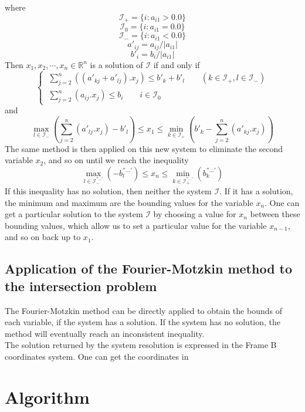 \documentclass[12pt, a4paper]{article}
\begin{document}
where 
$$\mathcal{I}_+=\{i:a_{i1}>0.0\}$$
$$\mathcal{I}_0=\{i:a_{i1}=0.0\}$$
$$\mathcal{I}_-=\{i:a_{i1}<0.0\}$$
$$a'_{ij}=a_{ij}/|a_{i1}|$$
$$b'_i=b_i/|a_{i1}|$$
Then $x_1, x_2, \cdots, x_n\in\mathbb{R}^n$ is a solution of $\mathcal{I}$ if and only if
\begin{equation}
\left\{\
\begin{array}{c}
\sum_{j=2}^n((a'_{kj}+a'_{lj}).x_j)\le b'_k+b'_l \qquad (k\in\mathcal{I}_+, l\in\mathcal{I}_-)\\
\sum_{j=2}^n(a_{ij}.x_j)\le b_i \qquad i\in\mathcal{I}_0
\end{array}
\right.
\end{equation}
and
\begin{equation}
\max_{l\in\mathcal{I}_-}(\sum_{j=2}^n(a'_{lj}.x_j)-b'_l)\le x_1\le\min_{k\in\mathcal{I}_+}(b'_k-\sum_{j=2}^n(a'_{kj}.x_j))
\end{equation}
The same method is then applied on this new system to eliminate the second variable $x_2$, and so on until we reach the inequality
\begin{equation}
\max_{l\in\mathcal{I}^{''...'}_-}(-b^{''...'}_l)\le x_n\le\min_{k\in\mathcal{I}^{''...'}_+}(b^{''...'}_k)
\end{equation}
If this inequality has no solution, then neither the system $\mathcal{I}$. If it has a solution, the minimum and maximum are the bounding values for the variable $x_n$. One can get a particular solution to the system $\mathcal{I}$ by choosing a value for $x_n$ between these bounding values, which allow us to set a particular value for the variable $x_{n-1}$, and so on back up to $x_1$. 

\subsection{Application of the Fourier-Motzkin method to the intersection problem}

The Fourier-Motzkin method can be directly applied to obtain the bounds of each variable, if the system has a solution. If the system has no solution, the method will eventually reach an inconsistent inequality.\\

The solution returned by the system resolution is expressed in the Frame B coordinates system. One can get the coordinates in 

\section{Algorithm}
\end{document}
